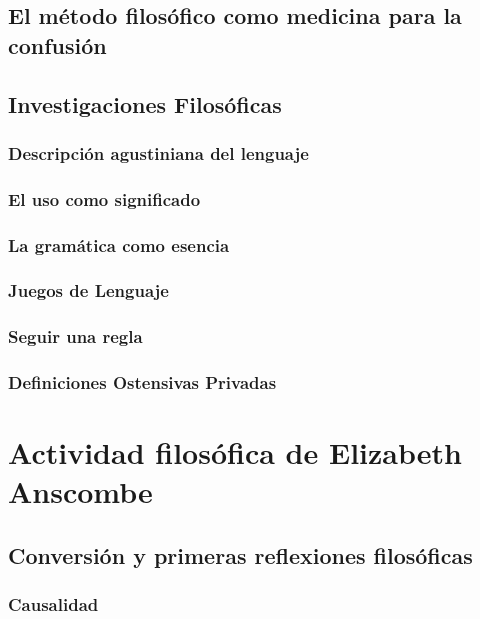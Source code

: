 \documentclass[./main.tex]{subfiles}
\begin{document}
\subsection{El método filosófico como medicina para la confusión}

\subsection{Investigaciones Filosóficas}

\subsubsection{Descripción agustiniana del lenguaje}

\subsubsection{El uso como significado}

\subsubsection{La gramática como esencia}

\subsubsection{Juegos de Lenguaje}

\subsubsection{Seguir una regla}

\subsubsection{Definiciones Ostensivas Privadas}

\newpage
\section{Actividad filosófica de Elizabeth Anscombe}

\subsection{Conversión y primeras reflexiones filosóficas}

\subsubsection{Causalidad}
\end{document}
